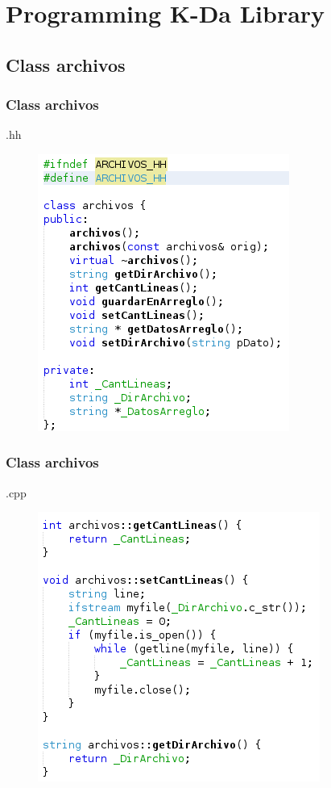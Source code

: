\documentclass{beamer}
\begin{document}

\section{Programming K-Da Library}
\subsection{Class archivos}

\begin{frame}
\frametitle{Class archivos}
.hh

\begin{figure}
\includegraphics[width=0.3\linewidth]{13.png}
\end{figure}


\end{frame}




\begin{frame}
\frametitle{Class archivos}
.cpp

\begin{figure}
\includegraphics[width=0.4\linewidth]{14.png}
\end{figure}


\end{frame}

\end{document}

